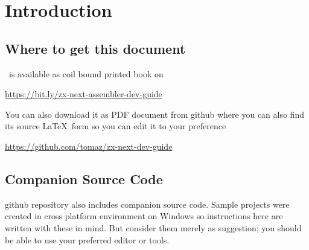 \chapter{Introduction}


\minitoc


\section{Where to get this document}

\BookTitle ~is available as coil bound printed book on

\url{https://bit.ly/zx-next-assembler-dev-guide}

You can also download it as PDF document from github where you can also find its source \LaTeX ~form so you can edit it to your preference

\url{https://github.com/tomaz/zx-next-dev-guide}


\section{Companion Source Code}

github repository also includes companion source code. Sample projects were created in cross platform environment on Windows so instructions here are written with these in mind. But consider them merely as suggestion; you should be able to use your preferred editor or tools.


